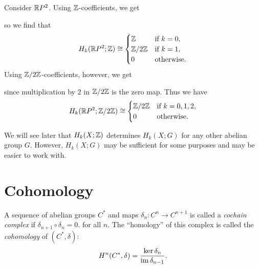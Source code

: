 \begin{example}
  Consider $\mathbb{R} P^2$. Using $\mathbb{Z}$-coefficients,
  we get
  \begin{center}
  \end{center}
  so we find that
  \[
    H_k(\mathbb{R} P^2; \mathbb{Z}) \cong
    \begin{cases}
      \mathbb{Z} & \text{if $k = 0$}, \\
      \mathbb{Z} / 2\mathbb{Z} & \text{if $k = 1$}, \\
      0 & \text{otherwise}.
    \end{cases}
  \]
  Using $\mathbb{Z} / 2\mathbb{Z}$-coefficients, however, we get
  \begin{center}
  \end{center}
  since multiplication by $2$ in $\mathbb{Z} / 2\mathbb{Z}$ is
  the zero map. Thus we have
  \[
    H_k(\mathbb{R} P^2; \mathbb{Z} / 2\mathbb{Z})
    \cong
    \begin{cases}
      \mathbb{Z} / 2\mathbb{Z} & \text{if $k = 0, 1, 2$}, \\
      0 & \text{otherwise}.
    \end{cases}
  \]
\end{example}

\begin{remark}
  We will see later that $H_k(X; \mathbb{Z})$ determines
  $H_k(X; G)$ for any other abelian group $G$.
  However, $H_k(X; G)$ may be sufficient for
  some purposes and may be easier to work
  with.
\end{remark}

\section{Cohomology}

\begin{definition}
  A sequence of abelian groups $C^*$ and maps
  $\delta_n : C^n \to C^{n + 1}$ is called a
  \emph{cochain complex} if $\delta_{n + 1} \circ \delta_n = 0$.
  for all $n$. The ``homology'' of this complex
  is called the \emph{cohomology} of
  $(C^*, \delta)$:
  \[
    H^n(C^*, \delta) = \frac{\ker \delta_n}{\operatorname{im} \delta_{n - 1}}.
  \]
\end{definition}

